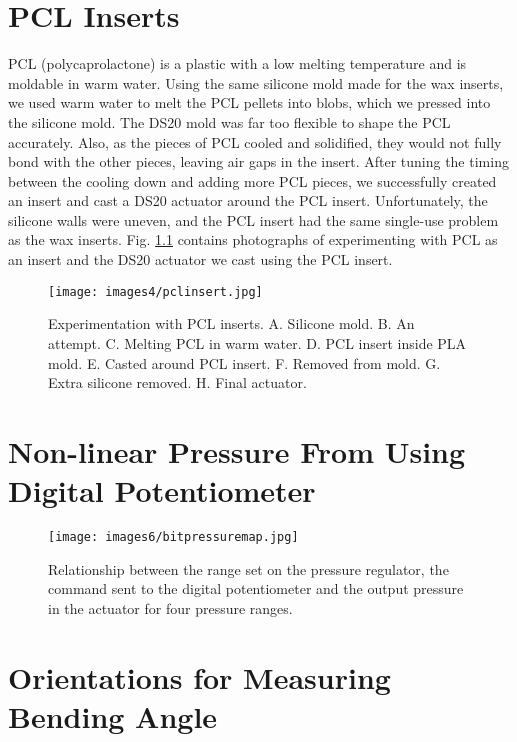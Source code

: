 \appendix

\chapter{PCL Inserts}
\label{appendix:pcl}

PCL (polycaprolactone) is a plastic with a low melting temperature and is moldable in warm water. Using the same silicone mold made for the wax inserts, we used warm water to melt the PCL pellets into blobs, which we pressed into the silicone mold. The DS20 mold was far too flexible to shape the PCL accurately. Also, as the pieces of PCL cooled and solidified, they would not fully bond with the other pieces, leaving air gaps in the insert. After tuning the timing between the cooling down and adding more PCL pieces, we successfully created an insert and cast a DS20 actuator around the PCL insert. Unfortunately, the silicone walls were uneven, and the PCL insert had the same single-use problem as the wax inserts. Fig. \ref{fig:pclinsert} contains photographs of experimenting with PCL as an insert and the DS20 actuator we cast using the PCL insert.

\begin{figure}[!ht]
    \centering
    \texttt{[image: images4/pclinsert.jpg]}
    \caption{Experimentation with PCL inserts. A. Silicone mold. B. An attempt. C. Melting PCL in warm water. D. PCL insert inside PLA mold. E. Casted around PCL insert. F. Removed from mold. G. Extra silicone removed. H. Final actuator.}
    \label{fig:pclinsert}
\end{figure}

\chapter{Non-linear Pressure From Using Digital Potentiometer}
\label{appendix:bitmap}

\begin{figure}[!ht]
    \centering
    \texttt{[image: images6/bitpressuremap.jpg]}
    \caption{Relationship between the range set on the pressure regulator, the command sent to the digital potentiometer and the output pressure in the actuator for four pressure ranges.}
\end{figure}

\chapter{Orientations for Measuring Bending Angle}
\label{appendix:ao}

